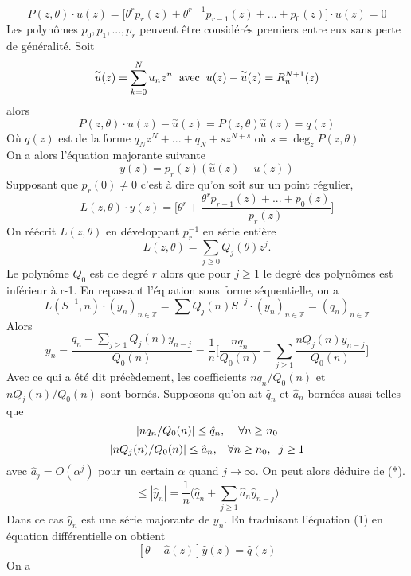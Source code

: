 \documentclass[a4paper,10.5pt]{article}
\begin{document}
	
	\[P(z,\theta) \cdot u(z)=\big[\theta^{r}p_r(z)+\theta^{r-1}p_{r-1}(z)+...+p_0(z)\big]\cdot u(z)=0\]
	Les polynômes $p_0,p_1,...,p_r$ peuvent être considérés premiers entre eux sans perte de généralité. Soit
	 \[\overset{\sim}{u}(z)=\sum_{k=0}^{N}u_n z^n\hspace{2mm}\text{avec}\hspace{2mm}u(z)-\overset{\sim}{u}(z)=R_u^{N+1}(z)\] 
	alors 
	\[  P(z,\theta) \cdot u(z)-\overset{\sim}{u}(z)=P(z,\theta)\overset{\sim}{u}(z)=q(z)\]
	Où $q(z)$ est de la forme $q_Nz^N+...+q_N+sz^{N+s}$ où $s= \deg_{z}P(z,\theta) $ 
	\\
	On a alors l'équation majorante suivante
	\[y(z)=p_r(z)(\overset{\sim}{u}(z)-u(z))\]
	Supposant que $p_r(0) \neq 0$ c'est à dire qu'on soit sur un point régulier,
	\[L(z,\theta)\cdot y(z)=\Big[\theta^{r}+\frac{\theta^{r}p_{r-1}(z)+...+p_0(z)}{p_r(z)}\Big]\]
	On réécrit $L(z,\theta)$ en développant $p_r^{-1}$ en série entière
	\[L(z,\theta)=\sum_{j\geq 0} Q_{j}(\theta)z^j.\]
	Le polynôme $Q_0$ est de degré $r$ alors que pour $j \geq 1$ le degré des polynômes est inférieur à r-1.
	En repassant l'équation sous forme séquentielle, on a 
	\[L(S^{-1},n)\cdot (y_n)_{n \in \mathbb{Z}}=\sum Q_j(n)S^{-j} \cdot  (y_n)_{n \in \mathbb{Z}} =(q_n)_{n \in \mathbb{Z}} \]
	Alors
	\[y_n=\frac{q_n-\sum_{j\geq1}Q_j(n)y_{n-j}}{Q_0(n)}= \frac{1}{n}\Big[\frac{nq_n}{Q_0(n)}-\sum_{j\geq1}\frac{nQ_j(n)y_{n-j}}{Q_0(n)}\Big]\tag{*}\]
	Avec ce qui a été dit précèdement, les coefficients $nq_n/Q_0(n)$ et $nQ_j(n)/Q_0(n)$ sont bornés.
	Supposons qu'on ait $\hat{q}_n$ et $\hat{a}_n$ bornées aussi telles que
	\begin{equation}
	|nq_n/Q_0(n)|\leq \hat{q}_n,  \hspace{4mm}\forall n\geq n_0\\
	\end{equation}
	\begin{equation}
	|nQ_j(n)/Q_0(n)|\leq \hat{a}_n,\hspace{3mm}  \forall n\geq n_0, \hspace{2mm} j\geq 1
	\end{equation}
	avec $\hat{a}_j=O(\alpha^j)$ pour un certain $\alpha$ quand $j \rightarrow \infty$. On peut alors déduire de (*).
	\[ \leq|\hat{y}_n|=\frac{1}{n}\Big(\hat{q}_n+\sum_{j\geq1}\hat{a}_{n}\hat{y}_{n-j}\Big)\tag{1}\]
	Dans ce cas $\hat{y}_n$ est une série majorante de $y_n$. En traduisant l'équation (1) en équation différentielle on obtient
	\[[\theta-\hat{a}(z)] \hat{y}(z) = \hat{q}(z)\]
	On a 
	
\end{document}
